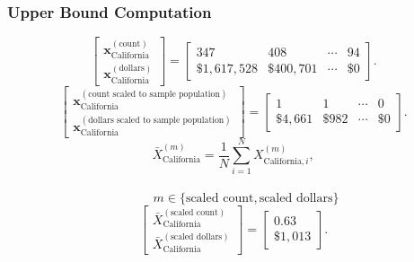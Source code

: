 \subsubsection{Upper Bound Computation}
\[
\begin{bmatrix}
\mathbf{x}_{\text{California}}^{(\text{count})}\\
\mathbf{x}_{\text{California}}^{(\text{dollars})}
\end{bmatrix}
=
\begin{bmatrix}
347 & 408 & \cdots & 94\\
\$1{,}617{,}528 &\$400{,}701  & \cdots &\$0 
\end{bmatrix}.
\]
\[
\begin{bmatrix}
\mathbf{x}_{\text{California}}^{(\text{count scaled to sample population})}\\
\mathbf{x}_{\text{California}}^{(\text{dollars scaled to sample population})}
\end{bmatrix}
=
\begin{bmatrix}
1 & 1 & \cdots & 0\\
\$4{,}661 &\$982 & \cdots &\$0
\end{bmatrix}.
\]
\[
\bar{X}_{\text{California}}^{(m)}
= \frac{1}{N}\sum_{i=1}^{N} X_{\text{California},i}^{(m)},
\]
\\
\[
\qquad
m \in \{\text{scaled count},\text{scaled dollars}\}
\]
\[
\begin{bmatrix}
\bar{X}_{\text{California}}^{(\text{scaled count})}\\
\bar{X}_{\text{California}}^{(\text{scaled dollars})}
\end{bmatrix}
=
\begin{bmatrix}
0.63\\
\$1{,}013
\end{bmatrix}.
\]
